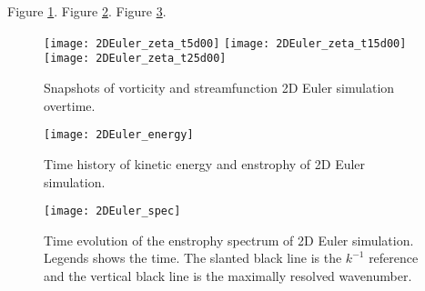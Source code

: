 \graphicspath{{2D_Euler/figs/}}




\section{}
Figure \ref{fig:2DEuler_zeta_t}. Figure \ref{fig:2DEuler_energy}. Figure \ref{fig:2DEuler_spec}. 

\begin{figure}
    \centering
    \texttt{[image: 2DEuler\_zeta\_t5d00]}
    \texttt{[image: 2DEuler\_zeta\_t15d00]}
    \texttt{[image: 2DEuler\_zeta\_t25d00]}
    \caption{Snapshots of vorticity and streamfunction 2D Euler simulation overtime.}
    \label{fig:2DEuler_zeta_t}
\end{figure}

\begin{figure}
    \centering
    \texttt{[image: 2DEuler\_energy]}
    \caption{Time history of kinetic energy and enstrophy of 2D Euler simulation.}
    \label{fig:2DEuler_energy}
\end{figure}


\begin{figure}
    \centering
    \texttt{[image: 2DEuler\_spec]}
    \caption{Time evolution of the enstrophy spectrum of 2D Euler simulation. Legends shows the time. The slanted black line is the $k^{-1}$ reference and the vertical black line is the maximally resolved wavenumber.}
    \label{fig:2DEuler_spec}
\end{figure}